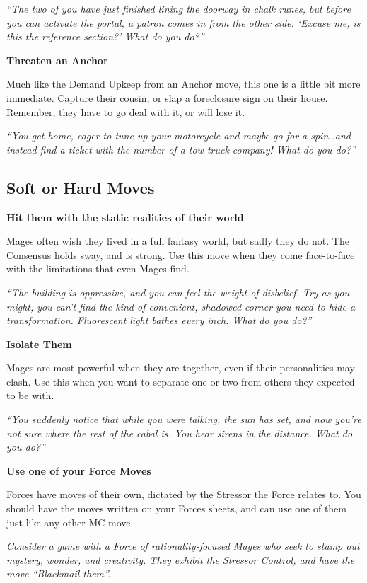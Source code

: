 \documentclass[
  oneside,
  statementpaper,
  9pt]{memoir}
\begin{document}
\emph{``The two of you have just finished lining the doorway in chalk
runes, but before you can activate the portal, a patron comes in from
the other side. `Excuse me, is this the reference section?' What do you
do?''}

\textbf{Threaten an Anchor}

Much like the Demand Upkeep from an Anchor move, this one is a little
bit more immediate. Capture their cousin, or slap a foreclosure sign on
their house. Remember, they have to go deal with it, or will lose it.

\emph{``You get home, eager to tune up your motorcycle and maybe go for
a spin\ldots and instead find a ticket with the number of a tow truck
company! What do you do?''}

\hypertarget{soft-or-hard-moves}{%
\subsection{Soft or Hard Moves}\label{soft-or-hard-moves}}

\textbf{Hit them with the static realities of their world}

Mages often wish they lived in a full fantasy world, but sadly they do
not. The Consensus holds sway, and is strong. Use this move when they
come face-to-face with the limitations that even Mages find.

\emph{``The building is oppressive, and you can feel the weight of
disbelief. Try as you might, you can't find the kind of convenient,
shadowed corner you need to hide a transformation. Fluorescent light
bathes every inch. What do you do?''}

\textbf{Isolate Them}

Mages are most powerful when they are together, even if their
personalities may clash. Use this when you want to separate one or two
from others they expected to be with.

\emph{``You suddenly notice that while you were talking, the sun has
set, and now you're not sure where the rest of the cabal is. You hear
sirens in the distance. What do you do?''}

\textbf{Use one of your Force Moves}

Forces have moves of their own, dictated by the Stressor the Force
relates to. You should have the moves written on your Forces sheets, and
can use one of them just like any other MC move.

\emph{Consider a game with a Force of rationality-focused Mages who seek
to stamp out mystery, wonder, and creativity. They exhibit the Stressor
Control, and have the move ``Blackmail them''.}
\end{document}
